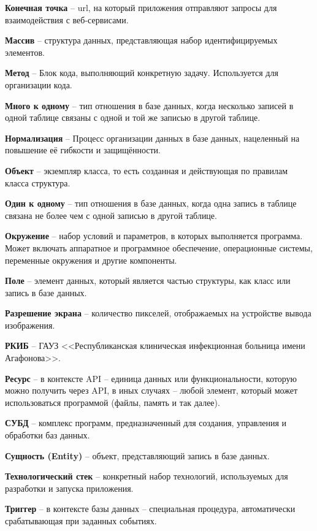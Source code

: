 \documentclass[a4paper,article]{article}
\begin{document}
\begin{sloppypar}
    \textbf{Конечная точка} -- url, на который приложения отправляют запросы для взаимодействия с веб-сервисами.

    \textbf{Массив} -- структура данных, представляющая набор идентифицируемых элементов.

    \textbf{Метод} -- Блок кода, выполняющий конкретную задачу. Используется для организации кода.

    \textbf{Много к одному} -- тип отношения в базе данных, когда несколько записей в одной таблице связаны с одной и той же записью в другой таблице.

    \textbf{Нормализация} -- Процесс организации данных в базе данных, нацеленный на повышение её гибкости и защищённости.

    \textbf{Объект} -- экземпляр класса, то есть созданная и действующая по правилам класса структура.

    \textbf{Один к одному} -- тип отношения в базе данных, когда одна запись в таблице связана не более чем с одной записью в другой таблице.

    \textbf{Окружение} -- набор условий и параметров, в которых выполняется программа. Может включать аппаратное и программное обеспечение, операционные системы, переменные окружения и другие компоненты.

    \textbf{Поле} -- элемент данных, который является частью структуры, как класс или запись в базе данных.

    \textbf{Разрешение экрана} -- количество пикселей, отображаемых на устройстве вывода изображения.

    \textbf{РКИБ} -- ГАУЗ <<Республиканская клиническая инфекционная больница имени Агафонова>>.

    \textbf{Ресурс} -- в контексте API -- единица данных или функциональности, которую можно получить через API, в иных случаях -- любой элемент, который может использоваться программой (файлы, память и так далее).

    \textbf{СУБД} -- комплекс программ, предназначенный для создания, управления и обработки баз данных.

    \textbf{Сущность (Entity)} -- объект, представляющий запись в базе данных.

    \textbf{Технологический стек} -- конкретный набор технологий, используемых для разработки и запуска приложения.

    \textbf{Триггер} -- в контексте базы данных -- специальная процедура, автоматически срабатывающая при заданных событиях.


\end{sloppypar}
\end{document}
